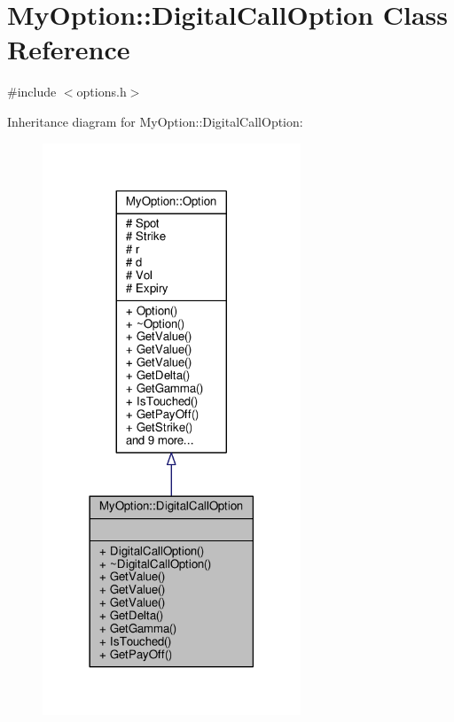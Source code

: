 \hypertarget{classMyOption_1_1DigitalCallOption}{}\section{My\+Option\+:\+:Digital\+Call\+Option Class Reference}
\label{classMyOption_1_1DigitalCallOption}


{\ttfamily \#include $<$options.\+h$>$}



Inheritance diagram for My\+Option\+:\+:Digital\+Call\+Option\+:
\nopagebreak
\begin{figure}[H]
\begin{center}
\leavevmode
\includegraphics[width=218pt]{classMyOption_1_1DigitalCallOption__inherit__graph}
\end{center}
\end{figure}


